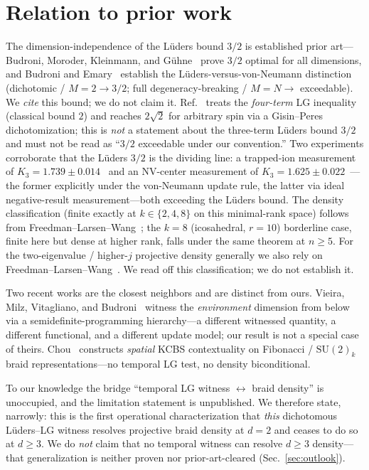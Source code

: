 \documentclass[aps,prx,reprint,amsmath,amssymb,floatfix,nofootinbib,superscriptaddress]{revtex4-2}
\begin{document}
\section{Relation to prior work}
\label{sec:prior}

The dimension-independence of the L\"uders bound $3/2$ is established prior
art---Budroni, Moroder, Kleinmann, and G\"uhne~\cite{BMKG} prove $3/2$ optimal for all
dimensions, and Budroni and Emary~\cite{BE} establish the L\"uders-versus-von-Neumann
distinction (dichotomic / $M=2 \to 3/2$; full degeneracy-breaking / $M=N \to$
exceedable). We \emph{cite} this bound; we do not claim it. Ref.~\cite{MM} treats
the \emph{four-term} LG inequality (classical bound $2$) and reaches $2\sqrt2$ for
arbitrary spin via a Gisin--Peres dichotomization; this is \emph{not} a statement
about the three-term L\"uders bound $3/2$ and must not be read as
``$3/2$ exceedable under our convention.'' Two experiments corroborate that the
L\"uders $3/2$ is the dividing line: a trapped-ion measurement of
$K_3 = 1.739 \pm 0.014$~\cite{TrappedIon2023} and an NV-center measurement of
$K_3 = 1.625 \pm 0.022$~\cite{NV2022}---the former explicitly under the von-Neumann
update rule, the latter via ideal negative-result measurement---both exceeding the
L\"uders bound. The density
classification (finite exactly at $k \in \{2,4,8\}$ on this minimal-rank space)
follows from Freedman--Larsen--Wang~\cite{FLW}; the $k=8$ (icosahedral, $r=10$)
borderline case, finite here but dense at higher rank, falls under the same
theorem at $n \ge 5$. For the two-eigenvalue / higher-$j$ projective density
generally we also rely on Freedman--Larsen--Wang~\cite{FLW}. We read off this
classification; we do not establish it.

Two recent works are the closest neighbors and are distinct from ours.
Vieira, Milz, Vitagliano, and Budroni~\cite{Vieira} witness the \emph{environment}
dimension from below via a semidefinite-programming hierarchy---a different witnessed
quantity, a different functional, and a different update model; our result is not a
special case of theirs. Chou~\cite{Chou} constructs \emph{spatial} KCBS contextuality
on Fibonacci / $\mathrm{SU}(2)_k$ braid representations---no temporal LG test, no
density biconditional.

To our knowledge the bridge ``temporal LG witness
$\leftrightarrow$ braid density'' is unoccupied, and the limitation statement is
unpublished. We therefore state, narrowly: this is the first operational
characterization that \emph{this} dichotomous L\"uders--LG witness resolves projective
braid density at $d=2$ and ceases to do so at $d \ge 3$. We do \emph{not} claim that
no temporal witness can resolve $d \ge 3$ density---that generalization is neither
proven nor prior-art-cleared (Sec.~\ref{sec:outlook}).
\end{document}
